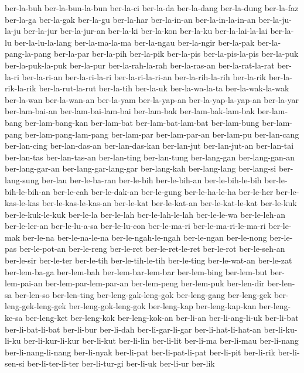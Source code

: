 {ber-la-buh ber-la-bun-la-bun ber-la-ci ber-la-da ber-la-dang ber-la-dung
ber-la-faz ber-la-ga ber-la-gak ber-la-gu ber-la-har ber-la-in-an
ber-la-in-la-in-an ber-la-ju-la-ju ber-la-jur ber-la-jur-an ber-la-ki
ber-la-kon ber-la-ku ber-la-lai-la-lai ber-la-lu ber-la-lu-la-lang
ber-la-ma-la-ma ber-la-ngau ber-la-ngir ber-la-pak ber-la-pang-la-pang
ber-la-par ber-la-pih ber-la-pik ber-la-pis ber-la-pis-la-pis ber-la-puk
ber-la-puk-la-puk ber-la-pur ber-la-rah-la-rah ber-la-ras-an
ber-la-rat-la-rat ber-la-ri ber-la-ri-an ber-la-ri-la-ri
ber-la-ri-la-ri-an ber-la-rih-la-rih ber-la-rik ber-la-rik-la-rik
ber-la-rut-la-rut ber-la-tih ber-la-uk ber-la-wa-la-ta ber-la-wak-la-wak
ber-la-wan ber-la-wan-an ber-la-yam ber-la-yap-an ber-la-yap-la-yap-an
ber-la-yar ber-lam-bai-an ber-lam-bai-lam-bai ber-lam-bak
ber-lam-bak-lam-bak ber-lam-bang ber-lam-bang-kan ber-lam-bat
ber-lam-bat-lam-bat ber-lam-bung ber-lam-pang ber-lam-pang-lam-pang
ber-lam-par ber-lam-par-an ber-lam-pu ber-lan-cang ber-lan-cing
ber-lan-das-an ber-lan-das-kan ber-lan-jut ber-lan-jut-an ber-lan-tai
ber-lan-tas ber-lan-tas-an ber-lan-ting ber-lan-tung ber-lang-gan
ber-lang-gan-an ber-lang-gar-an ber-lang-gar-lang-gar ber-lang-kah
ber-lang-lang ber-lang-si ber-lang-sung ber-lau ber-le-ba-ran ber-le-bih
ber-le-bih-an ber-le-bih-le-bih ber-le-bih-le-bih-an ber-le-cah
ber-le-dak-an ber-le-gung ber-le-ha-le-ha ber-le-her ber-le-kas-le-kas
ber-le-kas-le-kas-an ber-le-kat ber-le-kat-an ber-le-kat-le-kat ber-le-kuk
ber-le-kuk-le-kuk ber-le-la ber-le-lah ber-le-lah-le-lah ber-le-le-wa
ber-le-leh-an ber-le-ler-an ber-le-lu-a-sa ber-le-lu-con ber-le-ma-ri
ber-le-ma-ri-le-ma-ri ber-le-mak ber-le-na ber-le-na-le-na
ber-le-ngah-le-ngah ber-le-ngan ber-le-nong ber-le-pas ber-le-pot-an
ber-le-reng ber-le-ret ber-le-ret-le-ret ber-le-rot ber-le-seh-an
ber-le-sir ber-le-ter ber-le-tih ber-le-tih-le-tih ber-le-ting
ber-le-wat-an ber-le-zat ber-lem-ba-ga ber-lem-bah ber-lem-bar-lem-bar
ber-lem-bing ber-lem-but ber-lem-pai-an ber-lem-par-lem-par-an
ber-lem-peng ber-lem-puk ber-len-dir ber-len-sa ber-len-so ber-len-ting
ber-leng-gak-leng-gok ber-leng-gang ber-leng-gek ber-leng-gek-leng-gek
ber-leng-gok-leng-gok ber-leng-kap ber-leng-kap-kan ber-leng-ke-sa
ber-leng-ket ber-leng-kok ber-leng-kok-an ber-li-an ber-li-ang-li-uk
ber-li-bat ber-li-bat-li-bat ber-li-bur ber-li-dah ber-li-gar-li-gar
ber-li-hat-li-hat-an ber-li-ku-li-ku ber-li-kur-li-kur ber-li-kut
ber-li-lin ber-li-lit ber-li-ma ber-li-mau ber-li-nang ber-li-nang-li-nang
ber-li-nyak ber-li-pat ber-li-pat-li-pat ber-li-pit ber-li-rik
ber-li-sen-si ber-li-ter-li-ter ber-li-tur-gi ber-li-uk ber-li-ur ber-lik
}
